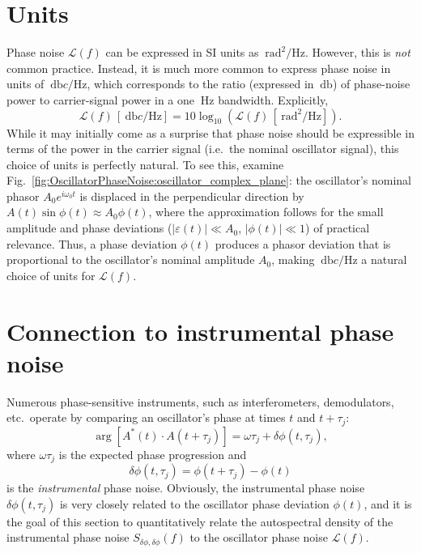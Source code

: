 \section{Units}
Phase noise $\mathcal{L}(f)$ can be expressed in SI units
as $\SI{}{\radian\squared\per\hertz}$.
However, this is \emph{not} common practice.
Instead, it is much more common to express phase noise in units of
$\SI{}{\decibel c \per\hertz}$, which
corresponds to the ratio (expressed in $\SI{}{\decibel}$)
of phase-noise power to carrier-signal power
in a one $\SI{}{\hertz}$ bandwidth.
Explicitly,
\begin{equation}
  \mathcal{L}(f) \, [\SI{}{\decibel c \per\hertz}]
  =
  10 \log_{10} \left(%
    \mathcal{L}(f) \, [\SI{}{\radian\squared\per\hertz}]
  \right).
\end{equation}
While it may initially come as a surprise that
phase noise should be expressible in terms
of the power in the carrier signal
(i.e.\ the nominal oscillator signal),
this choice of units is perfectly natural.
To see this, examine
Fig.~\ref{fig:OscillatorPhaseNoise:oscillator_complex_plane}:
the oscillator's nominal phasor $A_0 e^{i \omega_0 t}$
is displaced in the perpendicular direction
by $A(t) \sin\phi(t) \approx A_0 \phi(t)$, where
the approximation follows for the small amplitude and phase deviations
($|\varepsilon(t)| \ll A_0$, $|\phi(t)| \ll 1$) of practical relevance.
Thus, a phase deviation $\phi(t)$ produces a phasor deviation
that is proportional to the oscillator's nominal amplitude $A_0$,
making $\SI{}{\decibel c \per\hertz}$
a natural choice of units for $\mathcal{L}(f)$.


\section{Connection to instrumental phase noise}
Numerous phase-sensitive instruments,
such as interferometers, demodulators, etc.\,
operate by comparing an oscillator's phase
at times $t$ and $t + \tau_j$:
\begin{equation}
  \arg[A^*(t) \cdot A(t + \tau_j)]
  =
  \omega \tau_j + \delta \phi(t, \tau_j),
\end{equation}
where $\omega \tau_j$ is the expected phase progression and
\begin{equation}
  \delta \phi(t, \tau_j) = \phi(t + \tau_j) - \phi(t)
\end{equation}
is the \emph{instrumental} phase noise.
Obviously, the instrumental phase noise $\delta\phi(t, \tau_j)$
is very closely related to the oscillator phase deviation $\phi(t)$, and
it is the goal of this section
to quantitatively relate the autospectral density
of the instrumental phase noise $S_{\delta\phi,\delta\phi}(f)$
to the oscillator phase noise $\mathcal{L}(f)$.


